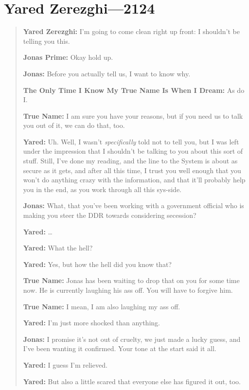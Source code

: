 \hypertarget{yared-zerezghi-2124}{%
\chapter{Yared Zerezghi—2124}\label{yared-zerezghi-2124}}

\begin{quote}
\textbf{Yared Zerezghi:} I'm going to come clean right up front: I shouldn't be telling you this.

\textbf{Jonas Prime:} Okay hold up.

\textbf{Jonas:} Before you actually tell us, I want to know why.

\textbf{The Only Time I Know My True Name Is When I Dream:} As do I.

\textbf{True Name:} I am sure you have your reasons, but if you need us to talk you out of it, we can do that, too.

\textbf{Yared:} Uh. Well, I wasn't \emph{specifically} told not to tell you, but I was left under the impression that I shouldn't be talking to you about this sort of stuff. Still, I've done my reading, and the line to the System is about as secure as it gets, and after all this time, I trust you well enough that you won't do anything crazy with the information, and that it'll probably help you in the end, as you work through all this sys-side.

\textbf{Jonas:} What, that you've been working with a government official who is making you steer the DDR towards considering secession?

\textbf{Yared:} \ldots{}

\textbf{Yared:} What the hell?

\textbf{Yared:} Yes, but how the hell did you know that?

\textbf{True Name:} Jonas has been waiting to drop that on you for some time now. He is currently laughing his ass off. You will have to forgive him.

\textbf{True Name:} I mean, I am also laughing my ass off.

\textbf{Yared:} I'm just more shocked than anything.

\textbf{Jonas:} I promise it's not out of cruelty, we just made a lucky guess, and I've been wanting it confirmed. Your tone at the start said it all.

\textbf{Yared:} I guess I'm relieved.

\textbf{Yared:} But also a little scared that everyone else has figured it out, too.


\end{quote}
